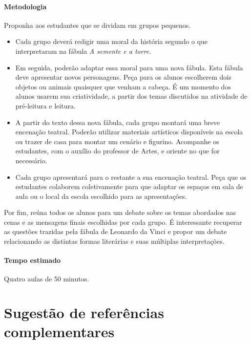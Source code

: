 \documentclass[11pt]{extarticle}
\begin{document}
\paragraph{Metodologia} Proponha aos estudantes que se dividam em grupos pequenos.

\begin{itemize}

\item Cada grupo deverá redigir uma moral da história segundo o que interpretaram na fábula \textit{A semente e a torre}.

\item Em seguida, poderão adaptar essa moral para uma nova fábula. Esta fábula deve apresentar novos personagens. Peça para os alunos escolherem dois objetos ou animais quaisquer que venham a cabeça. É um momento dos alunos usarem sua criatividade, a partir dos temas discutidos na atividade de pré-leitura e leitura.

\item A partir do texto dessa nova fábula, cada grupo montará uma breve encenação teatral. Poderão utilizar materiais artísticos disponíveis na escola ou trazer de casa para montar um cenário e figurino. Acompanhe os estudantes, com o auxílio do professor de Artes, e oriente no que for necessário. 

\item Cada grupo apresentará para o restante a sua encenação teatral. Peça que os estudantes colaborem coletivamente para que adaptar os espaços em sala de aula ou o local da escola escolhido para as apresentações. 

\end{itemize}

Por fim, reúna todos os alunos para um debate sobre os temas abordados nas cenas e as mensagens finais escolhidas por cada grupo. É interessante recuperar as questões trazidas pela fábula de Leonardo da Vinci e propor um debate relacionando as distintas formas literárias e suas múltiplas interpretações.

\paragraph{Tempo estimado} Quatro aulas de 50 minutos.

\section{Sugestão de referências complementares}
\end{document}
